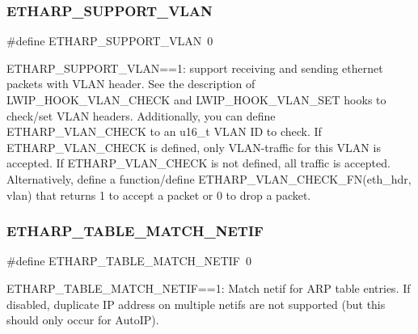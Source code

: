 \subsubsection{\texorpdfstring{E\+T\+H\+A\+R\+P\+\_\+\+S\+U\+P\+P\+O\+R\+T\+\_\+\+V\+L\+AN}{ETHARP\_SUPPORT\_VLAN}\hspace{0.1cm}{\footnotesize\ttfamily [2/2]}}
{\footnotesize\ttfamily \#define E\+T\+H\+A\+R\+P\+\_\+\+S\+U\+P\+P\+O\+R\+T\+\_\+\+V\+L\+AN~0}

E\+T\+H\+A\+R\+P\+\_\+\+S\+U\+P\+P\+O\+R\+T\+\_\+\+V\+L\+AN==1\+: support receiving and sending ethernet packets with V\+L\+AN header. See the description of L\+W\+I\+P\+\_\+\+H\+O\+O\+K\+\_\+\+V\+L\+A\+N\+\_\+\+C\+H\+E\+CK and L\+W\+I\+P\+\_\+\+H\+O\+O\+K\+\_\+\+V\+L\+A\+N\+\_\+\+S\+ET hooks to check/set V\+L\+AN headers. Additionally, you can define E\+T\+H\+A\+R\+P\+\_\+\+V\+L\+A\+N\+\_\+\+C\+H\+E\+CK to an u16\+\_\+t V\+L\+AN ID to check. If E\+T\+H\+A\+R\+P\+\_\+\+V\+L\+A\+N\+\_\+\+C\+H\+E\+CK is defined, only V\+L\+A\+N-\/traffic for this V\+L\+AN is accepted. If E\+T\+H\+A\+R\+P\+\_\+\+V\+L\+A\+N\+\_\+\+C\+H\+E\+CK is not defined, all traffic is accepted. Alternatively, define a function/define E\+T\+H\+A\+R\+P\+\_\+\+V\+L\+A\+N\+\_\+\+C\+H\+E\+C\+K\+\_\+\+F\+N(eth\+\_\+hdr, vlan) that returns 1 to accept a packet or 0 to drop a packet. \mbox{\label{group__lwip__opts__arp_ga2f762eee309a545650f80fc8dcc19084}} 
\subsubsection{\texorpdfstring{E\+T\+H\+A\+R\+P\+\_\+\+T\+A\+B\+L\+E\+\_\+\+M\+A\+T\+C\+H\+\_\+\+N\+E\+T\+IF}{ETHARP\_TABLE\_MATCH\_NETIF}\hspace{0.1cm}{\footnotesize\ttfamily [1/2]}}
{\footnotesize\ttfamily \#define E\+T\+H\+A\+R\+P\+\_\+\+T\+A\+B\+L\+E\+\_\+\+M\+A\+T\+C\+H\+\_\+\+N\+E\+T\+IF~0}

E\+T\+H\+A\+R\+P\+\_\+\+T\+A\+B\+L\+E\+\_\+\+M\+A\+T\+C\+H\+\_\+\+N\+E\+T\+IF==1\+: Match netif for A\+RP table entries. If disabled, duplicate IP address on multiple netifs are not supported (but this should only occur for Auto\+IP). \mbox{\label{group__lwip__opts__arp_ga2f762eee309a545650f80fc8dcc19084}} 
